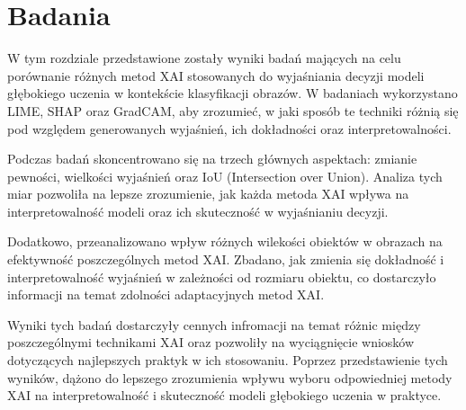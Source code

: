 
\chapter*{Badania}

W tym rozdziale przedstawione zostały wyniki badań mających na celu porównanie różnych metod XAI stosowanych do wyjaśniania decyzji modeli głębokiego uczenia w kontekście klasyfikacji obrazów.
W badaniach wykorzystano LIME, SHAP oraz GradCAM, aby zrozumieć, w jaki sposób te techniki różnią się pod względem generowanych wyjaśnień, ich dokładności oraz interpretowalności.

Podczas badań skoncentrowano się na trzech głównych aspektach: zmianie pewności, wielkości wyjaśnień oraz IoU (Intersection over Union).
Analiza tych miar pozwoliła na lepsze zrozumienie, jak każda metoda XAI wpływa na interpretowalność modeli oraz ich skuteczność w wyjaśnianiu decyzji.

Dodatkowo, przeanalizowano wpływ różnych wilekości obiektów w obrazach na efektywność poszczególnych metod XAI.
Zbadano, jak zmienia się dokładność i interpretowalność wyjaśnień w zależności od rozmiaru obiektu, co dostarczyło informacji na temat zdolności adaptacyjnych metod XAI.

Wyniki tych badań dostarczyły cennych infromacji na temat różnic między poszczególnymi technikami XAI oraz pozwoliły na wyciągnięcie wniosków dotyczących najlepszych praktyk w ich stosowaniu.
Poprzez przedstawienie tych wyników, dążono do lepszego zrozumienia wpływu wyboru odpowiedniej metody XAI na interpretowalność i skuteczność modeli głębokiego uczenia w praktyce.









%

%


